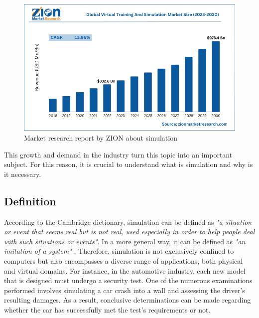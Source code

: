 \begin{figure}[H]
	\centering
 	\includegraphics[width=0.7\linewidth]{Images/ZION_MarketResearch.png}
 	\caption{Market research report by ZION about simulation \cite{zionMarketResearch}}
	 \label{fig_ZION_MarketResearch}
\end{figure}

This growth and demand in the industry turn this topic into an important subject. For this reason, it is crucial to understand what is 
simulation and why is it necessary.

\subsection{Definition}
\label{subsec:WhatIsSimulation}

According to the Cambridge dictionary, simulation can be defined as \emph{"a situation or event that seems real but is not real, used especially 
in order to help people deal with such situations or events"}. In a more general way, it can be defined as 
\emph{"an imitation of a system"} \cite{SimulationBook}. Therefore, simulation is not exclusively confined to computers but also encompasses a 
diverse range of applications, both physical and virtual domains. For instance, in the automotive industry, each new model that is designed must 
undergo a security test. One of the numerous examinations performed involves simulating a car crash into a wall and assessing the driver's 
resulting damages. As a result, conclusive determinations can be made regarding whether the car has successfully 
met the test's requirements or not.

